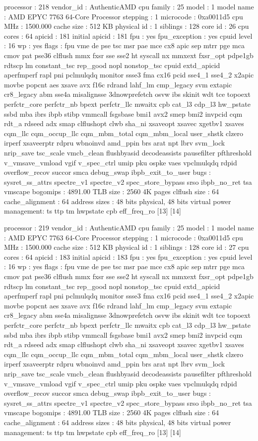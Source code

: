 processor	: 218
vendor_id	: AuthenticAMD
cpu family	: 25
model		: 1
model name	: AMD EPYC 7763 64-Core Processor
stepping	: 1
microcode	: 0xa0011d5
cpu MHz		: 1500.000
cache size	: 512 KB
physical id	: 1
siblings	: 128
core id		: 26
cpu cores	: 64
apicid		: 181
initial apicid	: 181
fpu		: yes
fpu_exception	: yes
cpuid level	: 16
wp		: yes
flags		: fpu vme de pse tsc msr pae mce cx8 apic sep mtrr pge mca cmov pat pse36 clflush mmx fxsr sse sse2 ht syscall nx mmxext fxsr_opt pdpe1gb rdtscp lm constant_tsc rep_good nopl nonstop_tsc cpuid extd_apicid aperfmperf rapl pni pclmulqdq monitor ssse3 fma cx16 pcid sse4_1 sse4_2 x2apic movbe popcnt aes xsave avx f16c rdrand lahf_lm cmp_legacy svm extapic cr8_legacy abm sse4a misalignsse 3dnowprefetch osvw ibs skinit wdt tce topoext perfctr_core perfctr_nb bpext perfctr_llc mwaitx cpb cat_l3 cdp_l3 hw_pstate ssbd mba ibrs ibpb stibp vmmcall fsgsbase bmi1 avx2 smep bmi2 invpcid cqm rdt_a rdseed adx smap clflushopt clwb sha_ni xsaveopt xsavec xgetbv1 xsaves cqm_llc cqm_occup_llc cqm_mbm_total cqm_mbm_local user_shstk clzero irperf xsaveerptr rdpru wbnoinvd amd_ppin brs arat npt lbrv svm_lock nrip_save tsc_scale vmcb_clean flushbyasid decodeassists pausefilter pfthreshold v_vmsave_vmload vgif v_spec_ctrl umip pku ospke vaes vpclmulqdq rdpid overflow_recov succor smca debug_swap ibpb_exit_to_user
bugs		: sysret_ss_attrs spectre_v1 spectre_v2 spec_store_bypass srso ibpb_no_ret tsa vmscape
bogomips	: 4891.00
TLB size	: 2560 4K pages
clflush size	: 64
cache_alignment	: 64
address sizes	: 48 bits physical, 48 bits virtual
power management: ts ttp tm hwpstate cpb eff_freq_ro [13] [14]

processor	: 219
vendor_id	: AuthenticAMD
cpu family	: 25
model		: 1
model name	: AMD EPYC 7763 64-Core Processor
stepping	: 1
microcode	: 0xa0011d5
cpu MHz		: 1500.000
cache size	: 512 KB
physical id	: 1
siblings	: 128
core id		: 27
cpu cores	: 64
apicid		: 183
initial apicid	: 183
fpu		: yes
fpu_exception	: yes
cpuid level	: 16
wp		: yes
flags		: fpu vme de pse tsc msr pae mce cx8 apic sep mtrr pge mca cmov pat pse36 clflush mmx fxsr sse sse2 ht syscall nx mmxext fxsr_opt pdpe1gb rdtscp lm constant_tsc rep_good nopl nonstop_tsc cpuid extd_apicid aperfmperf rapl pni pclmulqdq monitor ssse3 fma cx16 pcid sse4_1 sse4_2 x2apic movbe popcnt aes xsave avx f16c rdrand lahf_lm cmp_legacy svm extapic cr8_legacy abm sse4a misalignsse 3dnowprefetch osvw ibs skinit wdt tce topoext perfctr_core perfctr_nb bpext perfctr_llc mwaitx cpb cat_l3 cdp_l3 hw_pstate ssbd mba ibrs ibpb stibp vmmcall fsgsbase bmi1 avx2 smep bmi2 invpcid cqm rdt_a rdseed adx smap clflushopt clwb sha_ni xsaveopt xsavec xgetbv1 xsaves cqm_llc cqm_occup_llc cqm_mbm_total cqm_mbm_local user_shstk clzero irperf xsaveerptr rdpru wbnoinvd amd_ppin brs arat npt lbrv svm_lock nrip_save tsc_scale vmcb_clean flushbyasid decodeassists pausefilter pfthreshold v_vmsave_vmload vgif v_spec_ctrl umip pku ospke vaes vpclmulqdq rdpid overflow_recov succor smca debug_swap ibpb_exit_to_user
bugs		: sysret_ss_attrs spectre_v1 spectre_v2 spec_store_bypass srso ibpb_no_ret tsa vmscape
bogomips	: 4891.00
TLB size	: 2560 4K pages
clflush size	: 64
cache_alignment	: 64
address sizes	: 48 bits physical, 48 bits virtual
power management: ts ttp tm hwpstate cpb eff_freq_ro [13] [14]

